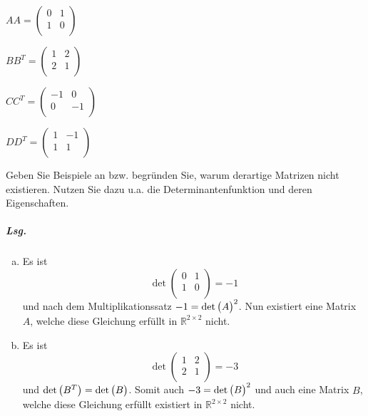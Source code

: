 \documentclass{scrreprt}
\begin{document}
\begin{enumerate}[(a)]
  \begin{enumerate*}[(a)]
  \item $AA = \begin{pmatrix}
    0 & 1 \\
    1 & 0 \\
  \end{pmatrix}$
  \item $BB^T = \begin{pmatrix}
    1 & 2 \\
    2 & 1 \\
  \end{pmatrix}$
  \item $CC^T = \begin{pmatrix}
    -1 & 0  \\
    0  & -1 \\
  \end{pmatrix}$
  \item $DD^T = \begin{pmatrix}
    1 & -1 \\
    1 & 1  \\
  \end{pmatrix}$
  \end{enumerate*}

  Geben Sie Beispiele an bzw. begründen Sie, warum derartige Matrizen nicht
  existieren.
  Nutzen Sie dazu u.a. die Determinantenfunktion und deren Eigenschaften.

  \subparagraph{Lsg.}
  \begin{enumerate}[(a)]
  \item Es ist
    \[
      \det\begin{pmatrix}
        0 & 1 \\
        1 & 0 \\
      \end{pmatrix} = -1
    \]
    und nach dem Multiplikationssatz $-1 = \det\qty\big(A)^2$.
    Nun existiert eine Matrix $A$, welche diese Gleichung erfüllt in
    $\mathbb{R}^{2 \times 2}$ nicht.

  \item Es ist
    \[
      \det\begin{pmatrix}
        1 & 2 \\
        2 & 1 \\
      \end{pmatrix} = -3
    \]
    und $\det\qty\big(B^T) = \det\qty\big(B)$.
    Somit auch $-3 = \det\qty\big(B)^2$ und auch eine Matrix $B$, welche diese
    Gleichung erfüllt existiert in $\mathbb{R}^{2 \times 2}$ nicht.


\end{enumerate}
\end{enumerate}
\end{document}

